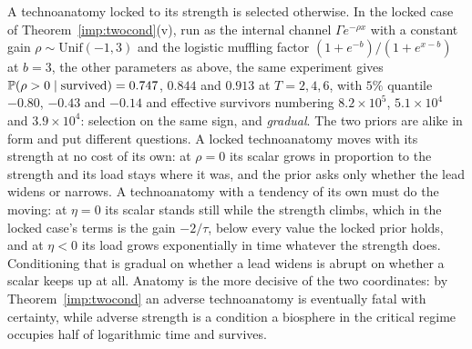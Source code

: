 A technoanatomy locked to its strength is selected otherwise. In the
locked case of Theorem~\ref{imp:twocond}(v), run as the internal channel
$\Gamma e^{-\rho x}$ with a constant gain $\rho\sim\mathrm{Unif}(-1,3)$
and the logistic muffling factor $(1+e^{-b})/(1+e^{x-b})$ at $b=3$, the
other parameters as above, the same experiment gives
$\mathbb{P}(\rho>0\mid\text{survived})=0.747$, $0.844$ and $0.913$ at
$T=2,4,6$, with $5\%$ quantile $-0.80$, $-0.43$ and $-0.14$ and
effective survivors numbering $8.2\times10^{5}$, $5.1\times10^{4}$ and $3.9\times10^{4}$: selection
on the same sign, and \emph{gradual}. The two priors are alike in form
and put different questions. A locked technoanatomy moves with its
strength at no cost of its own: at $\rho=0$ its scalar grows in proportion
to the strength and its load stays where it was, and the prior asks only
whether the lead widens or narrows. A technoanatomy with a tendency of its
own must do the moving: at $\eta=0$ its scalar stands still while the
strength climbs, which in the locked case's terms is the gain
$-2/\tau$, below every value the locked prior holds, and at $\eta<0$ its
load grows exponentially in time whatever the strength does. Conditioning
that is gradual on whether a lead widens is abrupt on whether a scalar
keeps up at all. Anatomy is the more
decisive of the two coordinates: by Theorem~\ref{imp:twocond} an adverse technoanatomy is
eventually fatal with certainty, while adverse strength is a condition
a biosphere in the critical regime occupies half of logarithmic time and
survives.

